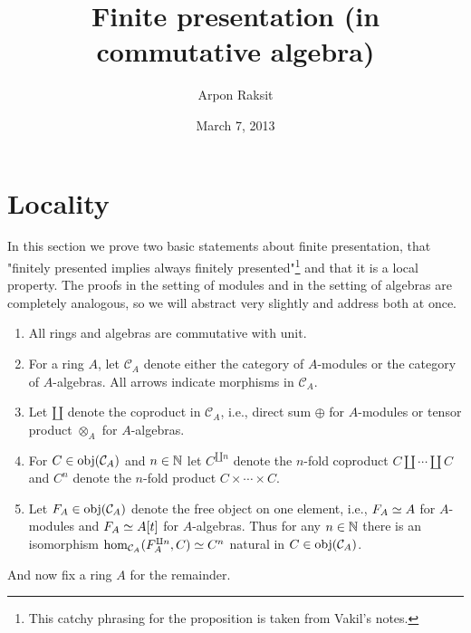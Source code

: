 

\title{Finite presentation (in commutative algebra)}
\author{Arpon Raksit}
\date{March 7, 2013}


\maketitle
\thispagestyle{fancy}


\section{Locality}

In this section we prove two basic statements about finite
presentation, that "finitely presented implies always finitely
presented"\footnote{This catchy phrasing for the proposition is taken
  from Vakil's notes.} and that it is a local property. The proofs in
the setting of modules and in the setting of algebras are completely
analogous, so we will abstract very slightly and address both at once.

\renewcommand{\C}{\mathcal{C}}

\begin{notation}
  \begin{enumerate}[leftmargin=*]
  \item All rings and algebras are commutative with unit.
  \item For a ring $A$, let $\C_A$ denote either the category of
    $A$-modules or the category of $A$-algebras. All arrows indicate
    morphisms in $\C_A$.
  \item Let $\amalg$ denote the coproduct in $\C_A$, i.e., direct sum
    $\oplus$ for $A$-modules or tensor product $\otimes_A$ for
    $A$-algebras.
  \item For $C \in \obj(\C_A)$ and $n \in \mathbb{N}$ let $C^{\amalg n}$
    denote the $n$-fold coproduct $C \amalg \cdots \amalg C$ and $C^n$
    denote the $n$-fold product $C \times \cdots \times C$.
  \item Let $F_A \in \obj(\C_A)$ denote the free object on one
    element, i.e., $F_A \simeq A$ for $A$-modules and $F_A \simeq A[t]$
    for $A$-algebras. Thus for any $n \in \mathbb{N}$ there is an isomorphism
    $\hom_{\C_A}(F_A^{\amalg n},C) \iso C^n$ natural in
    $C \in \obj(\C_A)$.
  \end{enumerate}
  And now fix a ring $A$ for the remainder.
\end{notation}

